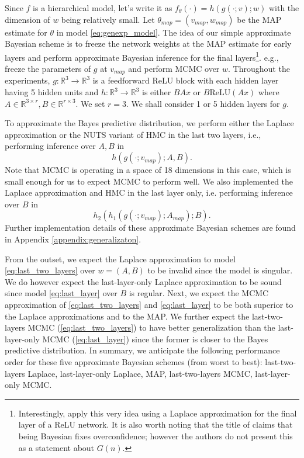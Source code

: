 \documentclass{article} %
\begin{document}
 Since $f$ is a hierarchical model, let's write it as $f_\theta(\cdot) = h(g(\cdot;v);w)$ with the dimension of $w$ being relatively small. Let $\theta_{map} = (v_{map}, w_{map})$ be the MAP estimate for $\theta$ in model \ref{eq:genexp_model}. The idea of our simple approximate Bayesian scheme is to freeze the network weights at the MAP estimate for early layers and perform approximate Bayesian inference for the final layers\footnote{Interestingly, \citet{kristiadi_being_2020} apply this very idea using a Laplace approximation for the final layer of a ReLU network. It is also worth noting that the title of \citet{kristiadi_being_2020} claims that being Bayesian fixes overconfidence; however the authors do not present this as a statement about $G(n)$.}. e.g., freeze the parameters of $g$ at $v_{map}$ and perform MCMC over $w$. 
Throughout the experiments, $g: \mathbb R^3 \to \mathbb R^3$ is a feedforward ReLU block with each hidden layer having 5 hidden units and $h: \mathbb R^3 \to \mathbb R^3$ is either $BAx$ or $B\text{ReLU}(Ax)$ where $A \in \mathbb R^{3 \times r}, B \in \mathbb R^{r \times 3}$. We set $r=3$. We shall consider 1 or 5 hidden layers for $g$. 

To approximate the Bayes predictive distribution, we perform either the Laplace approximation or the NUTS variant of HMC \citep{hoffman2014no} in the last two layers, i.e., performing inference over $A,B$ in
\begin{equation}
h(g(\cdot;v_{map});A,B).
\label{eq:last_two_layers}
\end{equation}
Note that MCMC is operating in a space of 18 dimensions in this case, which is small enough for us to expect MCMC to perform well.
We also implemented the Laplace approximation and HMC in the last layer only, i.e. performing inference over $B$ in
\begin{equation}
h_2(h_1(g(\cdot;v_{map});A_{map}); B).
\label{eq:last_layer}
\end{equation}
Further implementation details of these approximate Bayesian schemes are found in Appendix \ref{appendix:generalizaton}.


From the outset, we expect the Laplace approximation to model \ref{eq:last_two_layers} over $w = (A, B)$ to be invalid since the model is singular. We do however expect the last-layer-only Laplace approximation to be sound since model \ref{eq:last_layer} over $B$ is regular. Next, we expect the MCMC approximation of \eqref{eq:last_two_layers} and \eqref{eq:last_layer} to be both superior to the Laplace approximations and to the MAP. We further expect the last-two-layers MCMC (\eqref{eq:last_two_layers}) to have better generalization than the last-layer-only MCMC (\eqref{eq:last_layer}) since the former is closer to the Bayes predictive distribution. In summary, we anticipate the following performance order for these five approximate Bayesian schemes (from worst to best): last-two-layers Laplace, last-layer-only Laplace, MAP, last-two-layers MCMC, last-layer-only MCMC.
\end{document}
